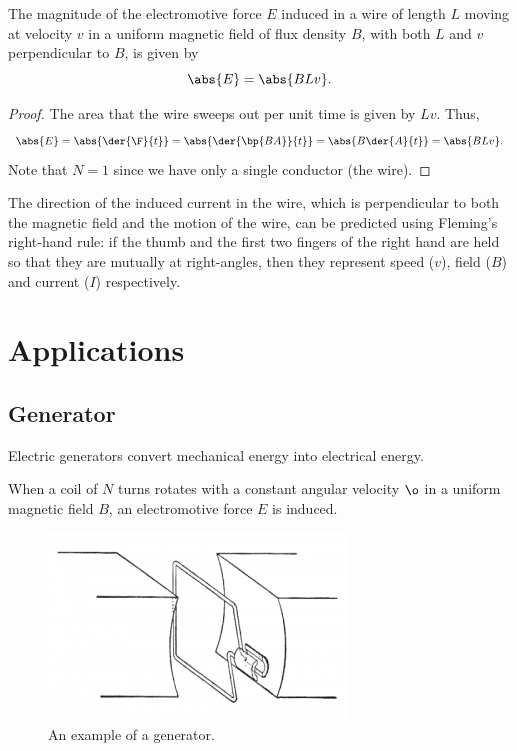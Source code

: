 \begin{proposition}
    The magnitude of the electromotive force $E$ induced in a wire of length $L$ moving at velocity $v$ in a uniform magnetic field of flux density $B$, with both $L$ and $v$ perpendicular to $B$, is given by \[\abs{E} = \abs{BLv}.\]
\end{proposition}
\begin{proof}
    The area that the wire sweeps out per unit time is given by $Lv$. Thus, \[\abs{E} = \abs{\der{\F}{t}} = \abs{\der{\bp{BA}}{t}} = \abs{B \der{A}{t}} = \abs{BLv}.\] Note that $N = 1$ since we have only a single conductor (the wire).
\end{proof}

The direction of the induced current in the wire, which is perpendicular to both the magnetic field and the motion of the wire, can be predicted using Fleming's right-hand rule: if the thumb and the first two fingers of the right hand are held so that they are mutually at right-angles, then they represent speed ($v$), field ($B$) and current ($I$) respectively.

\section{Applications}

\subsection{Generator}

Electric generators convert mechanical energy into electrical energy.

When a coil of $N$ turns rotates with a constant angular velocity $\o$ in a uniform magnetic field $B$, an electromotive force $E$ is induced.

\begin{figure}[H]
    \centering
    \includegraphics{media/Generator.png}
    \caption{An example of a generator.\protect\footnotemark}
\end{figure}

